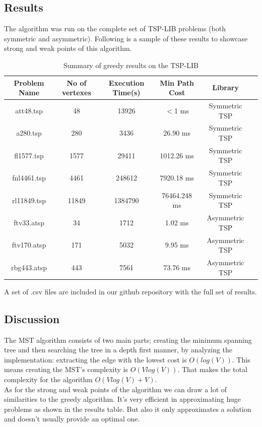 \documentclass[11pt, english]{article}
\begin{document}
\subsection{Results}
\begin{table}[!h]
	The algorithm was run on the complete set of TSP-LIB problems (both symmetric and asymmetric). Following is a sample of these results to showcase strong and weak points of this algorithm.
	\bigskip
	
	\centering
	\begin{tabular}{|c|c|c|c|c|c|}
		\hline
		Problem Name & No of vertexes  & Execution Time(s) & Min Path Cost &  Library  \\
		\hline\hline
		att48.tsp & 48 & 13926 & $<$1 ms & Symmetric TSP\\
		\hline
		a280.tsp & 280 & 3436 & 26.90 ms & Symmetric TSP\\
		\hline
		fl1577.tsp & 1577 & 29411 & 1012.26 ms & Symmetric TSP\\
		\hline
		fnl4461.tsp & 4461 & 248612 & 7920.18 ms & Symmetric TSP\\
		\hline
		rl11849.tsp & 11849 & 1384790 & 76464.248 ms & Symmetric TSP\\
		\hline\hline
		ftv33.atsp & 34 & 1712 & 1.02 ms & Asymmetric TSP\\
		\hline
		ftv170.atsp & 171 & 5032 & 9.95 ms & Asymmetric TSP\\
		\hline
		rbg443.atsp & 443 & 7561 & 73.76 ms & Asymmetric TSP\\
		\hline
		\hline
	\end{tabular}
	\begin{tablenotes}
		\small
		\item A set of .csv files are included in our github repository with the full set of results.
	\end{tablenotes}
	\caption{Summary of greedy results on the TSP-LIB}
	\label{greedy_table}
\end{table}

\subsection{Discussion}
The MST algorithm consists of two main parts; creating the minimum spanning tree and then searching the tree in a depth first manner, by analyzing the implementation: extracting the edge with the lowest cost is $O(log(V))$. This means creating the MST's complexity is $O(Vlog(V))$. That makes the total complexity for the algorithm $O(Vlog(V) + V)$.\\
As for the strong and weak points of the algorithm we can draw a lot of similarities to the greedy algorithm. It's very efficient in approximating huge problems as shown in the results table. But also it only approximates a solution and doesn't usually provide an optimal one.




\end{document}

